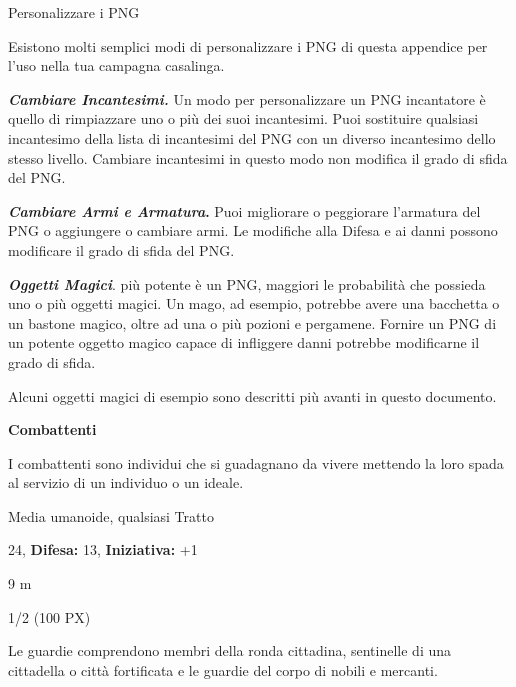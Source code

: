 \begin{multicols}{2}
{Personalizzare i PNG

Esistono molti semplici modi di personalizzare i PNG di questa appendice per l'uso nella tua campagna casalinga.

\emph{\textbf{Cambiare Incantesimi.}} Un modo per personalizzare un PNG incantatore è quello di rimpiazzare uno o più dei suoi incantesimi. Puoi sostituire qualsiasi incantesimo della lista di
incantesimi del PNG con un diverso incantesimo dello stesso livello. Cambiare incantesimi in questo modo non modifica il grado di sfida del PNG.

\textbf{\emph{Cambiare Armi e Armatura}.} Puoi migliorare o peggiorare l'armatura del PNG o aggiungere o cambiare armi. Le modifiche alla Difesa e ai danni possono modificare il grado di sfida del PNG.

\emph{\textbf{Oggetti Magici}}. più potente è un PNG, maggiori le probabilità che possieda uno o più oggetti magici. Un mago, ad esempio, potrebbe avere una bacchetta o un bastone magico, oltre ad una o più pozioni e pergamene. Fornire un PNG di un potente oggetto magico capace di infliggere danni potrebbe modificarne il grado di sfida.

Alcuni oggetti magici di esempio sono descritti più avanti in questo documento.

\textbf{Combattenti}

I combattenti sono individui che si guadagnano da vivere mettendo la loro spada al servizio di un individuo o un ideale.

\begin{description}[noitemsep, topsep=0pt, parsep=0pt, partopsep=0pt, leftmargin=0cm, labelwidth=2.2cm]
    \item[\textbf{Taglia/Tipo:}] Media umanoide, qualsiasi Tratto
    \item[\textbf{Caratt.:}] 
    \item[\textbf{Punti Ferita:}] 24,  \textbf{Difesa:} 13,  \textbf{Iniziativa:} +1
    \item[\textbf{Tiri Salvez.:}] 
    \item[\textbf{Movimento:}] 9 m
    \item[\textbf{Sfida:}] 1/2 (100 PX)\smallskip
\end{description}

Le guardie comprendono membri della ronda cittadina, sentinelle di una cittadella o città fortificata e le guardie del corpo di nobili e mercanti.

}
\end{multicols}
